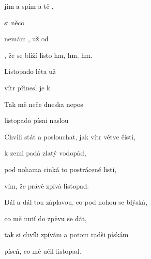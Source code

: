 

\zs
{} jím a  spím a  tě , 

 si  něco  

 nemám , už od   

, že se blíží listo hm, hm, hm.
\ks

\zr
Listopado  léta už  

vítr   přinesl je k  

Tak mě neče dneska  nepos

listopado  písni naslou
\kr

\zs
Chvíli stát a poslouchat, jak vítr větve čistí,

k zemi padá zlatý vodopád,

pod nohama cinká to postrácené listí,

vím, že právě zpívá listopad.
\ks

\zr

\kr

\zs
Dál a dál tou záplavou, co pod nohou se blýská,

co mě nutí do zpěvu se dát,

tak si chvíli zpívám a potom radši pískám

píseň, co mě učil listopad.
\ks

\zr
\kr

\kp
